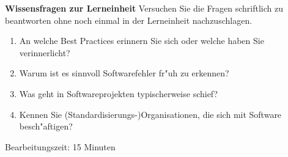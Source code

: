\begin{framed}
\textbf{Wissensfragen zur Lerneinheit}
\smallbreak
Versuchen Sie die Fragen schriftlich zu beantworten ohne noch einmal in der Lerneinheit nachzuschlagen.
\begin{enumerate}
\item An welche Best Practices erinnern Sie sich oder welche haben Sie verinnerlicht?
\item Warum ist es sinnvoll Softwarefehler fr"uh zu erkennen?
\item Was geht in Softwareprojekten typischerweise schief?
\item Kennen Sie (Standardisierungs-)Organisationen, die sich mit Software besch"aftigen?
\end{enumerate}
\bigbreak
\small Bearbeitungszeit: 15 Minuten
\end{framed}
\bigbreak
\bigbreak
